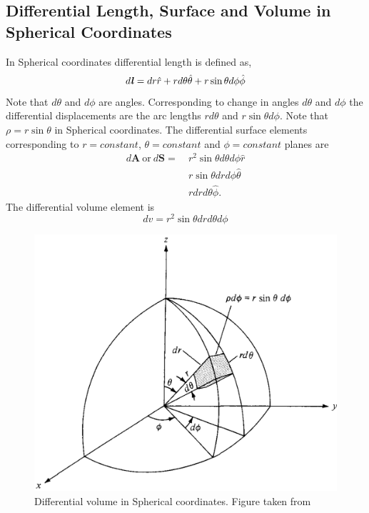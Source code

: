 \documentclass[12pt,a4paper]{article}
\begin{document}
\subsection{Differential Length, Surface and Volume in Spherical Coordinates}
In Spherical coordinates differential length is defined as,
\begin{equation}
d\textbf{\textit{l}}=dr\hat r+r d\theta\hat \theta+r\sin\theta d\phi\hat \phi
\end{equation}
Note that $d\theta$ and $d\phi$ are angles. Corresponding to change in angles $d\theta$ and $d\phi$ the differential displacements are the arc lengths $rd\theta$ and $r\sin\theta d\phi$. Note that $\rho=r\sin\theta$ in Spherical coordinates. The differential surface elements corresponding to $r=constant$, $\theta=constant$ and $\phi=constant$ planes are
\begin{equation}
\begin{split}
d\textbf{A}~\mathrm{or}~d\textbf{S}=~&r^2\sin\theta d\theta d\phi\hat r\\
&r\sin\theta dr d\phi\hat\theta\\
&r dr d\theta\hat\phi.
\end{split}
\end{equation}
The differential volume element is
\begin{equation}
dv=r^2\sin\theta dr d\theta d\phi
\end{equation}
\begin{figure}[H]
\centering
\includegraphics[scale=0.3]{Figure3-5S.png}
\caption{Differential volume in Spherical coordinates. Figure taken from~\cite[Figure 3.5, page 57]{Sadiku}}
\label{Spherical-differential-volume}
\end{figure}
\end{document}
